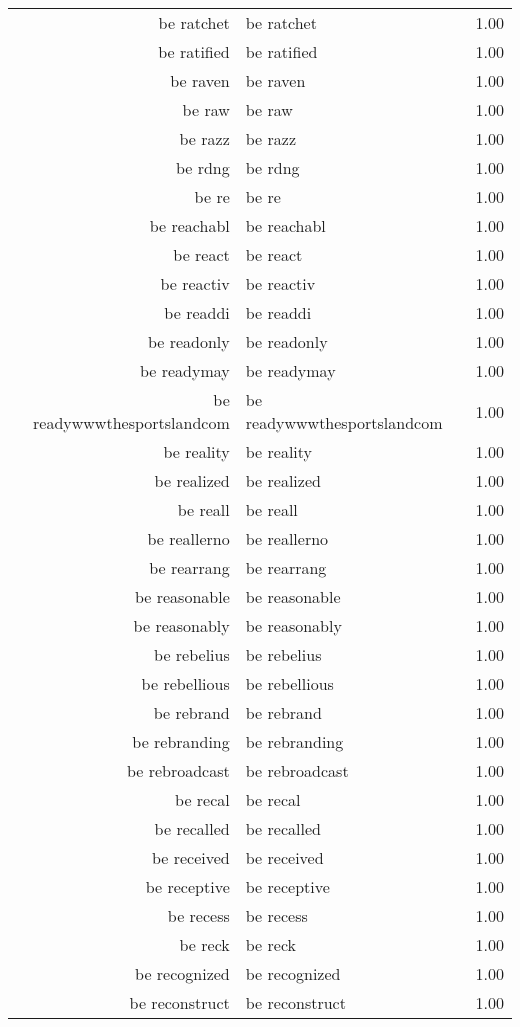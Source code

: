 \begin{table}[ht]
\begin{tabular}{rlr}
  be ratchet & be ratchet & 1.00 \\ 
  be ratified & be ratified & 1.00 \\ 
  be raven & be raven & 1.00 \\ 
  be raw & be raw & 1.00 \\ 
  be razz & be razz & 1.00 \\ 
  be rdng & be rdng & 1.00 \\ 
  be re & be re & 1.00 \\ 
  be reachabl & be reachabl & 1.00 \\ 
  be react & be react & 1.00 \\ 
  be reactiv & be reactiv & 1.00 \\ 
  be readdi & be readdi & 1.00 \\ 
  be readonly & be readonly & 1.00 \\ 
  be readymay & be readymay & 1.00 \\ 
  be readywwwthesportslandcom & be readywwwthesportslandcom & 1.00 \\ 
  be reality & be reality & 1.00 \\ 
  be realized & be realized & 1.00 \\ 
  be reall & be reall & 1.00 \\ 
  be reallerno & be reallerno & 1.00 \\ 
  be rearrang & be rearrang & 1.00 \\ 
  be reasonable & be reasonable & 1.00 \\ 
  be reasonably & be reasonably & 1.00 \\ 
  be rebelius & be rebelius & 1.00 \\ 
  be rebellious & be rebellious & 1.00 \\ 
  be rebrand & be rebrand & 1.00 \\ 
  be rebranding & be rebranding & 1.00 \\ 
  be rebroadcast & be rebroadcast & 1.00 \\ 
  be recal & be recal & 1.00 \\ 
  be recalled & be recalled & 1.00 \\ 
  be received & be received & 1.00 \\ 
  be receptive & be receptive & 1.00 \\ 
  be recess & be recess & 1.00 \\ 
  be reck & be reck & 1.00 \\ 
  be recognized & be recognized & 1.00 \\ 
  be reconstruct & be reconstruct & 1.00 \\ 

\end{tabular}
\end{table}
